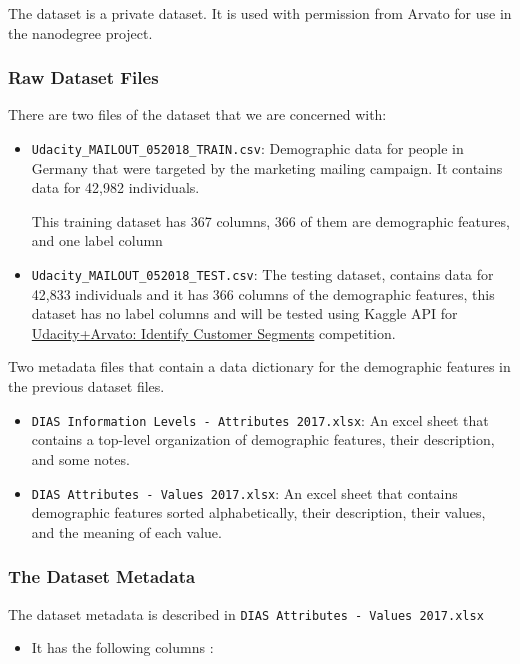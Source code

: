 \documentclass[a4paper]{article}
\begin{document}
{    The dataset is a private dataset. It is used with permission from Arvato for use in the nanodegree project.

    \subsubsection{Raw Dataset Files}
    \label{sec:raw-dataset-files}


    There are two files of the dataset that we are concerned with:
    \begin{itemize}
    \item \texttt{Udacity\_MAILOUT\_052018\_TRAIN.csv}: Demographic data for people in Germany that were targeted by the marketing mailing campaign. It contains data for 42,982 individuals.

      This training dataset has 367 columns, 366 of them are demographic features, and one label column \code{['RESPONSE']}
    \item \texttt{Udacity\_MAILOUT\_052018\_TEST.csv}: The testing dataset, contains data for 42,833 individuals and it has 366 columns of the demographic features, this dataset has no label columns and will be tested using Kaggle API for \href{https://www.kaggle.com/c/udacity-arvato-identify-customers/data}{Udacity+Arvato: Identify Customer Segments} competition.
    \end{itemize}

     Two metadata files that contain a data dictionary for the demographic features in the previous dataset files.

    \begin{itemize}
    \item \texttt{DIAS Information Levels - Attributes 2017.xlsx}: An excel sheet that contains a top-level organization of demographic features, their description, and some notes.
    \item \texttt{DIAS Attributes - Values 2017.xlsx}: An excel sheet that contains demographic features sorted alphabetically, their description, their values, and the meaning of each value.
    \end{itemize}
\pagebreak
    \subsubsection{The Dataset Metadata}
    \label{sec:dataset-metadata}

    The dataset metadata is described in \texttt{DIAS Attributes - Values 2017.xlsx} 

    \begin{itemize}
    \item It has the following columns :
      

\end{itemize}}
\end{document}
